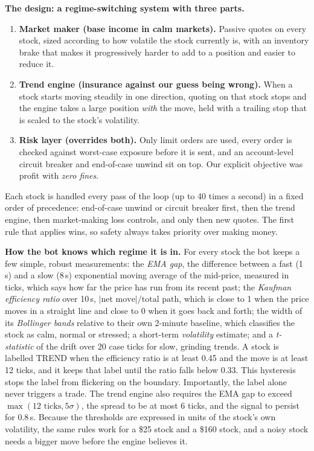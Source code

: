 \textbf{The design: a regime-switching system with three parts.}
\begin{enumerate}
  \item \textbf{Market maker (base income in calm markets).} Passive quotes on every stock, sized according to how volatile the stock currently is, with an
        inventory brake that makes it progressively harder to add to a position and easier to reduce it.
  \item \textbf{Trend engine (insurance against our guess being wrong).} When a stock starts moving steadily in one direction, quoting on that stock stops and
        the engine takes a large position \emph{with} the move, held with a trailing stop that is scaled to the stock's volatility.
  \item \textbf{Risk layer (overrides both).} Only limit orders are used, every order is checked against worst-case exposure before it is sent, and an account-level
        circuit breaker and end-of-case unwind sit on top. Our explicit objective was profit with \emph{zero fines}.
\end{enumerate}
Each stock is handled every pass of the loop (up to 40 times a second) in a fixed order of precedence: end-of-case unwind or circuit breaker first, then the trend engine,
then market-making loss controls, and only then new quotes. The first rule that applies wins, so safety always takes priority over making money.

\textbf{How the bot knows which regime it is in.} For every stock the bot keeps a few simple, robust measurements:
the \emph{EMA gap}, the difference between a fast (1\,s) and a slow (8\,s) exponential moving average of the mid-price, measured in ticks, which says how far the
price has run from its recent past; the \emph{Kaufman efficiency ratio} over 10\,s, $|\text{net move}|/\text{total path}$, which is close to 1 when the price moves in a
straight line and close to 0 when it goes back and forth; the width of its \emph{Bollinger bands} relative to their own 2-minute baseline, which classifies the stock as
calm, normal or stressed; a short-term \emph{volatility} estimate; and a \emph{t-statistic} of the drift over 20 case ticks for slow, grinding trends. A stock is labelled
TREND when the efficiency ratio is at least 0.45 and the move is at least 12 ticks, and it keeps that label until the ratio falls below 0.33. This hysteresis stops the label
from flickering on the boundary. Importantly, the label alone never triggers a trade. The trend engine also requires the EMA gap to exceed $\max(12\text{ ticks}, 5\sigma)$,
the spread to be at most 6 ticks, and the signal to persist for 0.8\,s. Because the thresholds are expressed in units of the stock's own volatility, the same rules work for a
\$25 stock and a \$160 stock, and a noisy stock needs a bigger move before the engine believes it.

